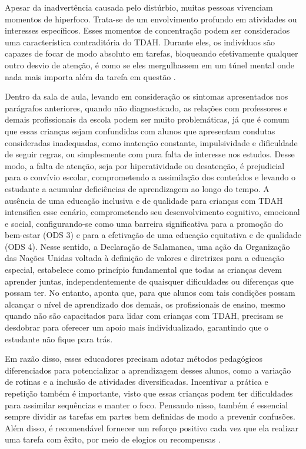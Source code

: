 Apesar da inadvertência causada pelo distúrbio, muitas pessoas vivenciam momentos de hiperfoco. Trata-se de um envolvimento profundo em atividades ou interesses específicos. Esses momentos de concentração podem ser considerados uma característica contraditória do TDAH. Durante eles, os indivíduos são capazes de focar de modo absoluto em tarefas, bloqueando efetivamente qualquer outro desvio de atenção, é como se eles mergulhassem em um túnel mental onde nada mais importa além da tarefa em questão \cite{Bernardes2022}.

Dentro da sala de aula, levando em consideração os sintomas apresentados nos parágrafos anteriores, quando não diagnosticado, as relações com professores e demais profissionais da escola podem ser muito problemáticas, já que é comum que essas crianças sejam confundidas com alunos que apresentam condutas consideradas inadequadas, como inatenção constante, impulsividade e dificuldade de seguir regras, ou simplesmente com pura falta de interesse nos estudos. Desse modo, a falta de atenção, seja por hiperatividade ou desatenção, é prejudicial para o convívio escolar, comprometendo a assimilação dos conteúdos e levando o estudante a acumular deficiências de aprendizagem ao longo do tempo. A ausência de uma educação inclusiva e de qualidade para crianças com TDAH intensifica esse cenário, comprometendo seu desenvolvimento cognitivo, emocional e social, configurando-se como uma barreira significativa para a promoção do bem-estar (ODS 3) e para a efetivação de uma educação equitativa e de qualidade (ODS 4). Nesse sentido, a Declaração de Salamanca, uma ação da Organização das Nações Unidas voltada à definição de valores e diretrizes para a educação especial, estabelece como princípio fundamental que todas as crianças devem aprender juntas, independentemente de quaisquer dificuldades ou diferenças que possam ter. No entanto, \cite[p.10]{Santos2023} aponta que, para que alunos com tais condições possam alcançar o nível de aprendizado dos demais, os profissionais de ensino,  mesmo quando não são capacitados para lidar com crianças com TDAH, precisam se desdobrar para oferecer um apoio mais individualizado, garantindo que o estudante não fique para trás.

Em razão disso, esses educadores precisam adotar métodos pedagógicos diferenciados para potencializar a aprendizagem desses alunos, como a variação de rotinas e a inclusão de atividades diversificadas. Incentivar a prática e repetição também é importante, visto que essas crianças podem ter dificuldades para assimilar sequências e manter o foco. Pensando nisso, também é essencial sempre dividir as tarefas em partes bem definidas de modo a prevenir confusões. Além disso, é recomendável fornecer um reforço positivo cada vez que ela realizar uma tarefa com êxito, por meio de elogios ou recompensas \cite{SM2025}.

